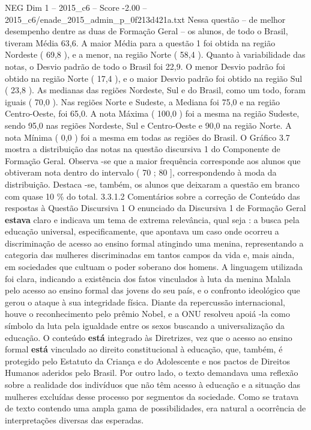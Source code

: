 \begin{textsample}{NEG Dim 1 – 2015\_c6 – Score -2.00 – 2015\_c6/enade\_2015\_admin\_p\_0f213d421a.txt}
Nessa questão – de melhor desempenho dentre as duas de Formação Geral – os alunos, de todo o Brasil, tiveram Média 63,6.
A maior Média para a questão 1 foi obtida na região Nordeste ( 69,8 ), e a menor, na região Norte ( 58,4 ).
Quanto à variabilidade das notas, o Desvio padrão de todo o Brasil foi 22,9.
O menor Desvio padrão foi obtido na região Norte ( 17,4 ), e o maior Desvio padrão foi obtido na região Sul ( 23,8 ).
As medianas das regiões Nordeste, Sul e do Brasil, como um todo, foram iguais ( 70,0 ).
Nas regiões Norte e Sudeste, a Mediana foi 75,0 e na região Centro-Oeste, foi 65,0.
A nota Máxima ( 100,0 ) foi a mesma na região Sudeste, sendo 95,0 nas regiões Nordeste, Sul e Centro-Oeste e 90,0 na região Norte.
A nota Mínima ( 0,0 ) foi a mesma em todas as regiões do Brasil.
O Gráfico 3.7 mostra a distribuição das notas na questão discursiva 1 do Componente de Formação Geral.
Observa -se que a maior frequência corresponde aos alunos que obtiveram nota dentro do intervalo ( 70 ; 80 ], correspondendo à moda da distribuição.
Destaca -se, também, os alunos que deixaram a questão em branco com quase 10 \% do total. 3.3.1.2 Comentários sobre a correção de Conteúdo das respostas à Questão Discursiva 1 O enunciado da Discursiva 1 de Formação Geral \textbf{estava} claro e indicava um tema de extrema relevância, qual seja : a busca pela educação universal, especificamente, que apontava um caso onde ocorreu a discriminação de acesso ao ensino formal atingindo uma menina, representando a categoria das mulheres discriminadas em tantos campos da vida e, mais ainda, em sociedades que cultuam o poder soberano dos homens.
A linguagem utilizada foi clara, indicando a existência dos fatos vinculados à luta da menina Malala pelo acesso ao ensino formal das jovens do seu país, e o confronto ideológico que gerou o ataque à sua integridade física.
Diante da repercussão internacional, houve o reconhecimento pelo prêmio Nobel, e a ONU resolveu apoiá -la como símbolo da luta pela igualdade entre os sexos buscando a universalização da educação.
O conteúdo \textbf{está} integrado às Diretrizes, vez que o acesso ao ensino formal \textbf{está} vinculado ao direito constitucional à educação, que, também, é protegido pelo Estatuto da Criança e do Adolescente e nos pactos de Direitos Humanos aderidos pelo Brasil.
Por outro lado, o texto demandava uma reflexão sobre a realidade dos indivíduos que não têm acesso à educação e a situação das mulheres excluídas desse processo por segmentos da sociedade.
Como se tratava de texto contendo uma ampla gama de possibilidades, era natural a ocorrência de interpretações diversas das esperadas.

\end{textsample}
